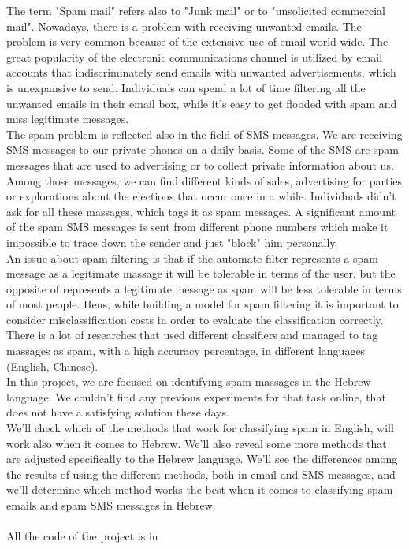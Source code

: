\documentclass[11pt,a4paper]{article}
\begin{document}
The term "Spam mail" refers also to "Junk mail" or to "unsolicited commercial mail". Nowadays, there is a problem with receiving unwanted emails. The problem is very common because of the extensive use of email world wide. The great popularity of the electronic communications channel is utilized by email accounts that indiscriminately send emails with unwanted advertisements, which is unexpansive to send. 
Individuals can spend a lot of time filtering all the unwanted emails in their email box, while it's easy to get flooded with spam and miss legitimate messages. \\
The spam problem is reflected also in the field of SMS messages. We are receiving SMS messages to our private phones on a daily basis. Some of the SMS are spam messages that are used to advertising or to collect private information about us. Among those messages, we can find different kinds of sales, advertising for parties or explorations about the elections that occur once in a while. Individuals didn't ask for all these massages, which tags it as spam messages. A significant amount of the spam SMS messages is sent from different phone numbers which make it impossible to trace down the sender and just "block" him personally. \\
An issue about spam filtering is that if the automate filter represents a spam message as a legitimate massage it will be tolerable in terms of the user, but the opposite of represents a legitimate message as spam will be less tolerable in terms of most people. Hens, while building a model for spam filtering it is important to consider misclassification costs in order to evaluate the classification correctly.\\
 There is a lot of researches that used different classifiers and managed to tag massages as spam, with a high accuracy percentage, in different languages (English, Chinese). \\
In this project, we are focused on identifying spam massages in the Hebrew language. We couldn't find any previous experiments for that task online, that does not have a satisfying solution these days.\\
We'll check which of the methods that work for classifying spam in English, will work also when it comes to Hebrew. We'll also reveal some more methods that are adjusted specifically to the Hebrew language. We'll see the differences among the results of using the different methods, both in email and SMS messages, and we'll determine which method works the best when it comes to classifying spam emails and spam SMS messages in Hebrew.\\\\
All the code of the project is in \citep{git}
\end{document}
